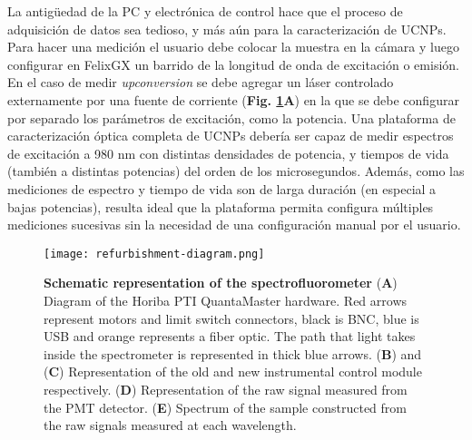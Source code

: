 La antigüedad de la PC y electrónica de control hace que el proceso de adquisición de datos sea tedioso, y más aún para la caracterización de UCNPs.
Para hacer una medición el usuario debe colocar la muestra en la cámara y luego configurar en FelixGX un barrido de la longitud de onda de excitación o emisión.
En el caso de medir \textit{upconversion} se debe agregar un láser controlado externamente por una fuente de corriente (\textbf{Fig. \ref{fig:ref-diagram}A}) en la que se debe configurar por separado los parámetros de excitación, como la potencia.
Una plataforma de caracterización óptica completa de UCNPs debería ser capaz de medir espectros de excitación a 980 nm con distintas densidades de potencia, y tiempos de vida (también a distintas potencias) del orden de los microsegundos.
Además, como las mediciones de espectro y tiempo de vida son de larga duración (en especial a bajas potencias), resulta ideal que la plataforma permita configura múltiples mediciones sucesivas sin la necesidad de una configuración manual por el usuario.



\begin{figure}[btp]
     \centering
     \texttt{[image: refurbishment-diagram.png]}
     \caption{
    \textbf{Schematic representation of the spectrofluorometer}
    (\textbf{A}) Diagram of the Horiba PTI QuantaMaster hardware. Red arrows represent motors and limit switch connectors, black is BNC, blue is USB and orange represents a fiber optic. The path that light takes inside the spectrometer is represented in thick blue arrows. 
    (\textbf{B}) and (\textbf{C}) Representation of the old and new instrumental control module respectively.
    (\textbf{D}) Representation of the raw signal measured from the PMT detector.
    (\textbf{E}) Spectrum of the sample constructed from the raw signals measured at each wavelength.
    }
     \label{fig:ref-diagram}
\end{figure}

